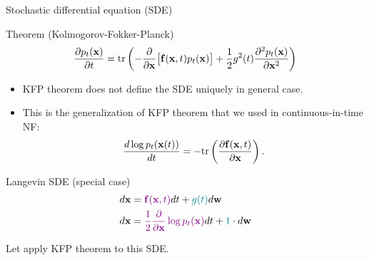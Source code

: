 \begin{frame}{Stochastic differential equation (SDE)}
 	\begin{block}{Theorem (Kolmogorov-Fokker-Planck)}
 		\vspace{-0.2cm}
 		\[
 			\frac{\partial p_t(\mathbf{x})}{\partial t} = \text{tr}\left(- \frac{\partial}{\partial \mathbf{x}} \bigl[ \mathbf{f}(\mathbf{x}, t) p_t(\mathbf{x})\bigr] + \frac{1}{2} g^2(t) \frac{\partial^2 p_t(\mathbf{x})}{\partial \mathbf{x}^2} \right)
 		\]
 	\end{block}
 	 \begin{itemize}
 	 	\item KFP theorem does not define the SDE uniquely in general case.
 		 \item This is the generalization of KFP theorem that we used in continuous-in-time NF:
 	 	\[
 	 		\frac{d \log p_t(\mathbf{x}(t))}{d t} = - \text{tr} \left( \frac{\partial \mathbf{f}(\mathbf{x}, t)}{\partial \mathbf{x}} \right).
 	 	\]
 	 \end{itemize}
	\vspace{-0.3cm}
 	\begin{block}{Langevin SDE (special case)}
 		\vspace{-0.6cm}
 		\begin{align*}
 			d\mathbf{x} &= {\color{violet}\mathbf{f}(\mathbf{x}, t)} dt + {\color{teal}g(t)} d \mathbf{w} \\
 			d \mathbf{x} &= {\color{violet}\frac{1}{2} \frac{\partial}{\partial \mathbf{x}} \log p_t(\mathbf{x})} d t + {\color{teal} 1 } \cdot d \mathbf{w}
 		\end{align*}
 		\vspace{-0.4cm}
 	\end{block}
 	Let apply KFP theorem to this SDE.
\end{frame}
